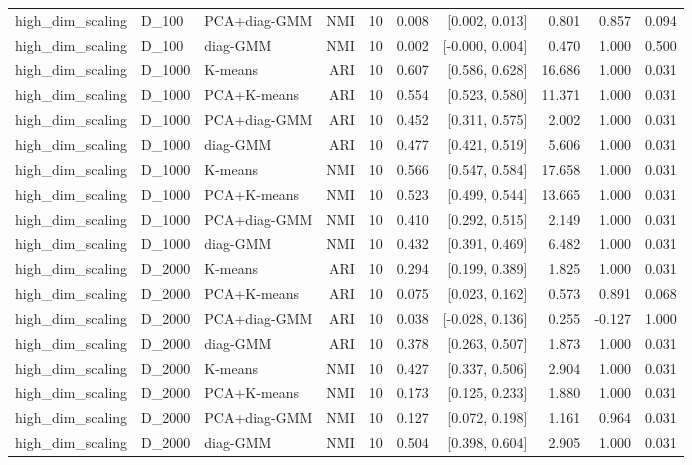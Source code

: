 \begin{table}[t]
\begin{tabular}{lllrrrrrr}
high\_dim\_scaling & D\_100 & PCA+diag-GMM & NMI & 10 & 0.008 & [0.002, 0.013] & 0.801 & 0.857 & 0.094 \\
high\_dim\_scaling & D\_100 & diag-GMM & NMI & 10 & 0.002 & [-0.000, 0.004] & 0.470 & 1.000 & 0.500 \\
high\_dim\_scaling & D\_1000 & K-means & ARI & 10 & 0.607 & [0.586, 0.628] & 16.686 & 1.000 & 0.031 \\
high\_dim\_scaling & D\_1000 & PCA+K-means & ARI & 10 & 0.554 & [0.523, 0.580] & 11.371 & 1.000 & 0.031 \\
high\_dim\_scaling & D\_1000 & PCA+diag-GMM & ARI & 10 & 0.452 & [0.311, 0.575] & 2.002 & 1.000 & 0.031 \\
high\_dim\_scaling & D\_1000 & diag-GMM & ARI & 10 & 0.477 & [0.421, 0.519] & 5.606 & 1.000 & 0.031 \\
high\_dim\_scaling & D\_1000 & K-means & NMI & 10 & 0.566 & [0.547, 0.584] & 17.658 & 1.000 & 0.031 \\
high\_dim\_scaling & D\_1000 & PCA+K-means & NMI & 10 & 0.523 & [0.499, 0.544] & 13.665 & 1.000 & 0.031 \\
high\_dim\_scaling & D\_1000 & PCA+diag-GMM & NMI & 10 & 0.410 & [0.292, 0.515] & 2.149 & 1.000 & 0.031 \\
high\_dim\_scaling & D\_1000 & diag-GMM & NMI & 10 & 0.432 & [0.391, 0.469] & 6.482 & 1.000 & 0.031 \\
high\_dim\_scaling & D\_2000 & K-means & ARI & 10 & 0.294 & [0.199, 0.389] & 1.825 & 1.000 & 0.031 \\
high\_dim\_scaling & D\_2000 & PCA+K-means & ARI & 10 & 0.075 & [0.023, 0.162] & 0.573 & 0.891 & 0.068 \\
high\_dim\_scaling & D\_2000 & PCA+diag-GMM & ARI & 10 & 0.038 & [-0.028, 0.136] & 0.255 & -0.127 & 1.000 \\
high\_dim\_scaling & D\_2000 & diag-GMM & ARI & 10 & 0.378 & [0.263, 0.507] & 1.873 & 1.000 & 0.031 \\
high\_dim\_scaling & D\_2000 & K-means & NMI & 10 & 0.427 & [0.337, 0.506] & 2.904 & 1.000 & 0.031 \\
high\_dim\_scaling & D\_2000 & PCA+K-means & NMI & 10 & 0.173 & [0.125, 0.233] & 1.880 & 1.000 & 0.031 \\
high\_dim\_scaling & D\_2000 & PCA+diag-GMM & NMI & 10 & 0.127 & [0.072, 0.198] & 1.161 & 0.964 & 0.031 \\
high\_dim\_scaling & D\_2000 & diag-GMM & NMI & 10 & 0.504 & [0.398, 0.604] & 2.905 & 1.000 & 0.031 \\

\end{tabular}
\end{table}

